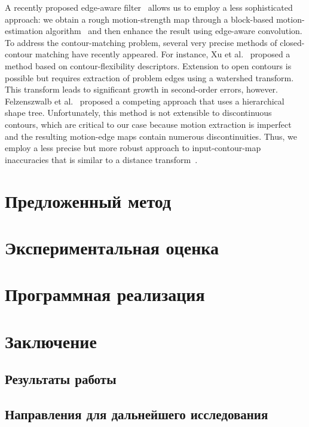 \documentclass[14pt, a4paper]{extarticle}
\begin{document}
A recently proposed edge-aware filter~\cite{he2013guided} allows us to employ a less sophisticated approach: we obtain a rough motion-strength map through a block-based motion-estimation algorithm~\cite{simonyan2008fast} and then enhance the result using edge-aware convolution.
To address the contour-matching problem, several very precise methods of closed-contour matching have recently appeared. For instance, Xu et al.~\cite{xu20092d} proposed a method based on contour-flexibility descriptors. Extension to open contours is possible but requires extraction of problem edges using a watershed transform. This transform leads to significant growth in second-order errors, however. Felzenszwalb et al.~\cite{felzenszwalb2007hierarchical} proposed a competing approach that uses a hierarchical shape tree. Unfortunately, this method is not extensible to discontinuous contours, which are critical to our case because motion extraction is imperfect and the resulting motion-edge maps contain numerous discontinuities. Thus, we employ a less precise but more robust approach to input-contour-map inaccuracies that is similar to a distance transform~\cite{borgefors1986distance}.

\newpage
\section{Предложенный метод}

%


\newpage
\section{Экспериментальная оценка}

\newpage
\section{Программная реализация}

\newpage
\section{Заключение}

\subsection{Результаты работы}

\subsection{Направления для дальнейшего исследования}
\end{document}
